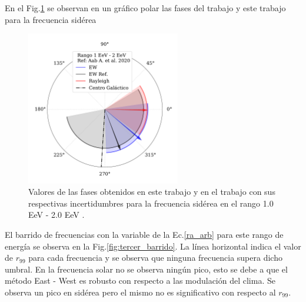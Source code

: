     En el Fig.\ref{fig:tercer} se observan en un gráfico polar las fases del trabajo \cite{Aab_2020} y este trabajo para la frecuencia sidérea
    \begin{figure}[H]
        \begin{small}
            \begin{center}
                \includegraphics[width=0.6\textwidth]{phase_tercer_bin_v3.pdf}
            \end{center}
        \caption{Valores de las fases obtenidos en este trabajo y en el trabajo \cite{Aab_2020} con sus respectivas incertidumbres para la frecuencia sidérea en el  rango 1.0 EeV - 2.0 EeV .}
        \label{fig:tercer}
        \end{small}
    \end{figure}


    El barrido de frecuencias con la variable de la Ec.\ref{ra_arb} para este rango de energía se observa en la Fig.\ref{fig:tercer_barrido}. La línea horizontal indica el valor de $r_{99}$ para cada frecuencia y se observa que ninguna frecuencia supera dicho umbral. En la frecuencia solar no se observa ningún pico, esto se debe a que el método East - West es robusto con respecto a las modulación del clima. Se observa un pico en sidérea pero el mismo no es significativo con respecto al $r_{99}$.


